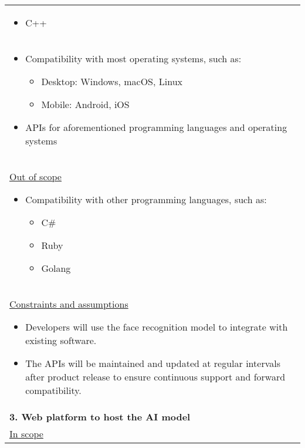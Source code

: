 \begin{longtable}{ | p{} l | }
{\begin{itemize}
\begin{itemize}
                    \item C++
                \end{itemize}
        \end{itemize}
    } \\
    \multicolumn{2}{|p{\textwidth}|}{
        \begin{itemize}
            \item Compatibility with most operating systems, such as:
                \begin{itemize}
                    \item Desktop: Windows, macOS, Linux
                    \item Mobile: Android, iOS
                \end{itemize}
            \item APIs for aforementioned programming languages and operating systems
        \end{itemize}
    } \\
    \multicolumn{2}{|p{\textwidth}|}{\hspace{0.6cm}\underline{Out of scope}
        \begin{itemize}
            \item Compatibility with other programming languages, such as:
                \begin{itemize}
                    \item C\#
                    \item Ruby
                    \item Golang
                \end{itemize}
        \end{itemize}
    } \\
    \multicolumn{2}{|p{\textwidth}|}{\hspace{0.6cm}\underline{Constraints and assumptions}
        \begin{itemize}
            \item Developers will use the face recognition model to integrate with existing software.
            \item The APIs will be maintained and updated at regular intervals after product release to ensure continuous support and forward compatibility.
        \end{itemize}
    } \\
    \multicolumn{2}{|p{\textwidth}|}{\textbf{3. Web platform to host the AI model}} \\
    \multicolumn{2}{|p{\textwidth}|}{\hspace{0.6cm}\underline{In scope}
}
\end{longtable}
